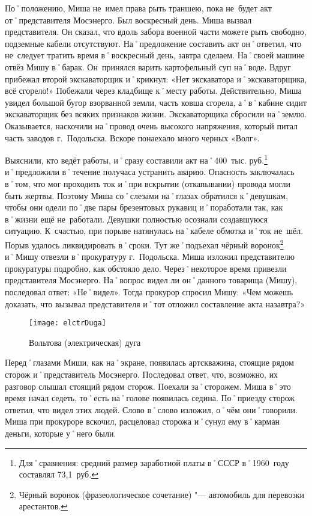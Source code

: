 По˚положению, Миша не~имел права рыть траншею, пока не~будет акт от˚представителя Мосэнерго. Был воскресный день. Миша вызвал представителя. Он сказал, что вдоль забора военной части можете рыть свободно, подземные кабели отсутствуют. На˚предложение составить акт он˚ответил, что не~следует тратить время в˚воскресный день, завтра сделаем. На˚своей машине отвёз Мишу в˚барак. Он~принялся варить картофельный суп на˚воде. Вдруг прибежал второй экскаваторщик и˚крикнул: «Нет экскаватора и˚экскаваторщика, всё сгорело!» Побежали через кладбище к˚месту работы. Действительно, Миша увидел большой бугор взорванной земли, часть ковша сгорела, а˚в˚кабине сидит экскаваторщик без всяких признаков жизни. Экскаваторщика сбросили на˚землю. Оказывается, наскочили на˚провод очень высокого напряжения, который питал часть заводов г.~Подольска. Вскоре понаехало много черных «Волг». 

Выяснили, кто ведёт работы, и˚сразу составили акт на˚400~тыс. руб.\footnote{Для˚сравнения: средний размер заработной платы в˚СССР в˚1960~году составлял 73,1~руб.} и˚предложили в˚течение получаса устранить аварию. Опасность заключалась в˚том, что мог проходить ток и˚при вскрытии (откапывании) провода могли быть жертвы. Поэтому Миша со˚слезами на˚глазах обратился к˚девушкам, чтобы они одели по˚две пары брезентовых рукавиц и˚поработали так, как в˚жизни ещё не~работали. Девушки полностью осознали создавшуюся ситуацию. К~счастью, при порыве натянулась на˚кабеле обмотка и˚ток не~шёл. Порыв удалось ликвидировать в˚сроки. Тут же˚подъехал чёрный воронок\footnote{Чёрный воронок (фразеологическое сочетание) "--- автомобиль для перевозки арестантов.} и˚Мишу отвезли в˚прокуратуру г.~Подольска. Миша изложил представителю прокуратуры подробно, как обстояло дело. Через˚некоторое время привезли представителя Мосэнерго. На˚вопрос видел ли он˚данного товарища (Мишу), последовал ответ: «Не˚видел». Тогда прокурор спросил Мишу: «Чем можешь доказать, что вызывал представителя и˚тот отложил составление акта назавтра?» 

\begin{wrapfigure}{O}{.4\textwidth}
\centering
\texttt{[image: elctrDuga]}
\caption{Вольтова (электрическая) дуга}
\label{fig:elctrDuga}
\end{wrapfigure}
Перед˚глазами Миши, как на˚экране, появилась артскважина, стоящие рядом сторож и˚представитель Мосэнерго. Последовал ответ, что, возможно, их разговор слышал стоящий рядом сторож. Поехали за˚сторожем. Миша в˚это время начал седеть, то˚есть на˚голове появилась седина. По˚приезду сторож ответил, что видел этих людей. Слово в˚слово изложил, о˚чём они˚говорили. Миша при прокуроре вскочил, расцеловал сторожа и˚сунул ему в˚карман деньги, которые у˚него были.

